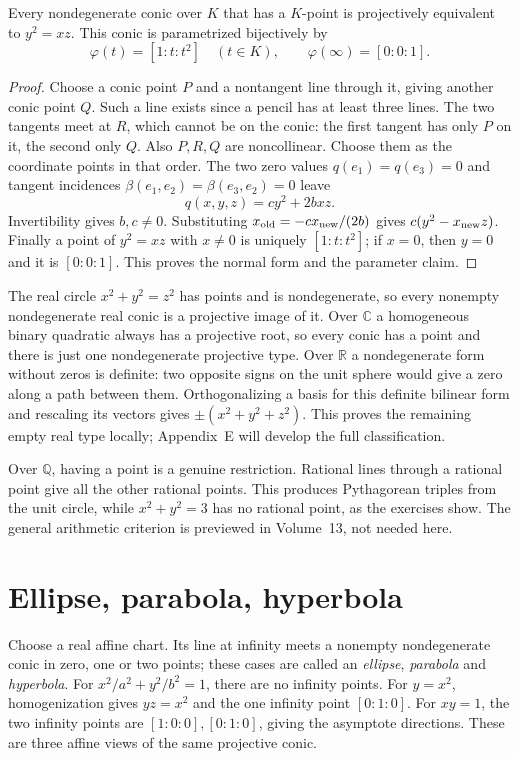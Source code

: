 \begin{theorem}\label{geometry:thm:normalform}
Every nondegenerate conic over $K$ that has a $K$-point is projectively equivalent to $y^2=xz$. This conic is parametrized bijectively by
\[
\varphi(t)=[1:t:t^2]\quad(t\in K),\qquad
\varphi(\infty)=[0:0:1].
\]
\end{theorem}
\begin{proof}
Choose a conic point $P$ and a nontangent line through it, giving another conic point $Q$. Such a line exists since a pencil has at least three lines. The two tangents meet at $R$, which cannot be on the conic: the first tangent has only $P$ on it, the second only $Q$. Also $P,R,Q$ are noncollinear. Choose them as the coordinate points in that order. The two zero values $q(e_1)=q(e_3)=0$ and tangent incidences $\beta(e_1,e_2)=\beta(e_3,e_2)=0$ leave
\[
q(x,y,z)=cy^2+2bxz.
\]
Invertibility gives $b,c\ne0$. Substituting $x_{\rm old}=-c x_{\rm new}/(2b)$ gives $c(y^2-x_{\rm new}z)$. Finally a point of $y^2=xz$ with $x\ne0$ is uniquely $[1:t:t^2]$; if $x=0$, then $y=0$ and it is $[0:0:1]$. This proves the normal form and the parameter claim.
\end{proof}

The real circle $x^2+y^2=z^2$ has points and is nondegenerate, so every nonempty nondegenerate real conic is a projective image of it. Over $\mathbb C$ a homogeneous binary quadratic always has a projective root, so every conic has a point and there is just one nondegenerate projective type. Over $\mathbb R$ a nondegenerate form without zeros is definite: two opposite signs on the unit sphere would give a zero along a path between them. Orthogonalizing a basis for this definite bilinear form and rescaling its vectors gives $\pm(x^2+y^2+z^2)$. This proves the remaining empty real type locally; Appendix~E will develop the full classification.

Over $\mathbb Q$, having a point is a genuine restriction. Rational lines through a rational point give all the other rational points. This produces Pythagorean triples from the unit circle, while $x^2+y^2=3$ has no rational point, as the exercises show. The general arithmetic criterion is previewed in Volume~13, not needed here.

\section{Ellipse, parabola, hyperbola}

Choose a real affine chart. Its line at infinity meets a nonempty nondegenerate conic in zero, one or two points; these cases are called an \emph{ellipse}, \emph{parabola} and \emph{hyperbola}. For $x^2/a^2+y^2/b^2=1$, there are no infinity points. For $y=x^2$, homogenization gives $yz=x^2$ and the one infinity point $[0:1:0]$. For $xy=1$, the two infinity points are $[1:0:0],[0:1:0]$, giving the asymptote directions. These are three affine views of the same projective conic.

